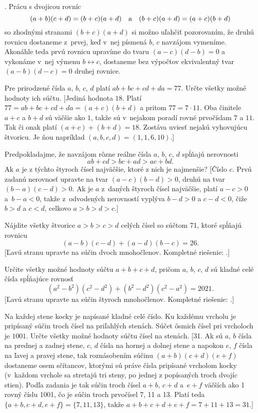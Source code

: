 {.
Prácu s dvojicou rovníc
$$
(a+b)(c+d)=(b+c)(a+d) \quad\hbox{a}\quad (b+c)(a+d)=(a+c)(b+d)
$$
so zhodnými stranami $(b+c)(a+d)$ si možno uľahčiť pozorovaním,
že druhú rovnicu dostaneme z~prvej, keď v~nej písmená $b$, $c$
navzájom vymeníme.
Akonáhle teda prvú rovnicu upravíme do tvaru
$(a-c)(d-b)=0$ a vykonáme v~nej výmenu $b\leftrightarrow c$,
dostaneme bez výpočtov ekvivalentný tvar $(a-b)(d-c)=0$ druhej
rovnice.


Pre prirodzené čísla $a$, $b$, $c$, $d$ platí
$ab+bc+cd+da=77$. Určte všetky možné hodnoty ich súčtu.
[Jediná hodnota $18$. Platí $77=ab+bc+cd+da={{(a+c)}{(b+d)}}$ a pritom
$77=7\cdot11$. Oba činitele $a+c$ a $b+d$
sú väčšie ako $1$, takže sú v~nejakom poradí rovné
prvočíslam $7$ a $11$. Tak či onak platí
$(a+c)+(b+d)=18$. Zostáva uviesť nejakú vyhovujúcu štvoricu.
Je ňou napríklad $(a,b,c,d)=(1,1,6,10)$.]

Predpokladajme, že navzájom rôzne reálne čísla $a$,
$b$, $c$, $d$ spĺňajú nerovnosti
$$
ab + cd > bc + ad > ac +bd.
$$
Ak $a$ je z týchto štyroch čísel najväčšie, ktoré z nich je
najmenšie?
[Číslo $c$. Prvú zadanú nerovnosť upravte na tvar
$(a-c)(b-d)>0$, druhú na tvar $(b-a)(c-d)>0$. Ak je
$a$ z~daných štyroch čísel najväčšie, platí $a-c>0$ a~$b-a<0$,
takže z~odvodených nerovností vyplýva $b-d>0$ a $c-d<0$, čiže
$b>d$ a $c<d$, celkovo $a>b>d>c$.]

\D
Nájdite všetky štvorice $a>b>c>d$ celých čísel so súčtom 71,
ktoré spĺňajú rovnicu
$$
(a-b)(c-d)+(a-d)(b-c)=26.
$$
[Ľavú stranu upravte na súčin dvoch mnohočlenov.
Kompletné riešenie: .]

Určite všetky možné hodnoty súčtu $a+b+c+d$, pričom
$a$, $b$, $c$, $d$ sú kladné celé čísla spĺňajúce rovnosť
$$
(a^2-b^2)(c^2-d^2)+(b^2-d^2)(c^2-a^2)=2021.
$$
[Ľavú stranu upravte na súčin štyroch mnohočlenov.
Kompletné riešenie: .]

Na každej stene kocky je napísané kladné celé číslo. Ku
každému vrcholu je pripísaný súčin troch čísel na priľahlých
stenách. Súčet ôsmich čísel pri vrcholoch je $1001$. Určte
všetky možné hodnoty súčtu čísel na stenách.
[31. Ak sú $a$, $b$ čísla na prednej a zadnej stene, $c$, $d$ čísla na hornej a dolnej stene a napokon $e$, $f$ čísla na ľavej a
pravej stene, tak roznásobením súčinu $(a+b)(c+d)(e+f)$
dostaneme osem sčítancov, ktorými sú práve čísla pripísané
vrcholom kocky (v~každom vrchole sa stretajú tri steny, po
jednej z popísaných troch dvojíc stien). Podľa zadania je tak
súčin troch čísel $a+b$, $c+d$ a~$e+f$ väčších ako 1 rovný číslu
1001, čo je súčin troch prvočísel 7, 11 a 13. Platí teda
$\{a+b,c+d,e+f\}=\{7,11,13\}$, takže
$a+b+c+d+e+f=7+11+13=31$.]

}
